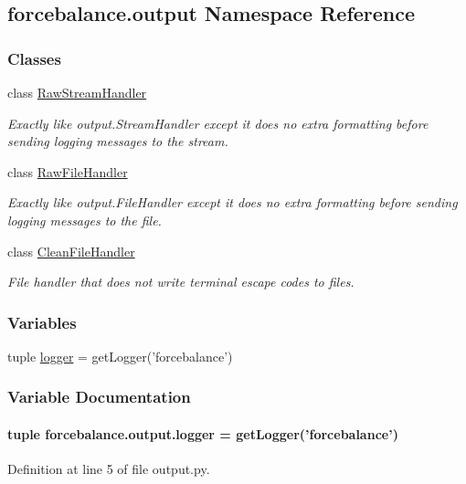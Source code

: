 \hypertarget{namespaceforcebalance_1_1output}{\subsection{forcebalance.\-output Namespace Reference}
\label{namespaceforcebalance_1_1output}
}
\subsubsection*{Classes}
\begin{DoxyCompactItemize}
\item 
class \hyperlink{classforcebalance_1_1output_1_1RawStreamHandler}{Raw\-Stream\-Handler}
\begin{DoxyCompactList}\small\item\em Exactly like output.\-Stream\-Handler except it does no extra formatting before sending logging messages to the stream. \end{DoxyCompactList}\item 
class \hyperlink{classforcebalance_1_1output_1_1RawFileHandler}{Raw\-File\-Handler}
\begin{DoxyCompactList}\small\item\em Exactly like output.\-File\-Handler except it does no extra formatting before sending logging messages to the file. \end{DoxyCompactList}\item 
class \hyperlink{classforcebalance_1_1output_1_1CleanFileHandler}{Clean\-File\-Handler}
\begin{DoxyCompactList}\small\item\em File handler that does not write terminal escape codes to files. \end{DoxyCompactList}\end{DoxyCompactItemize}
\subsubsection*{Variables}
\begin{DoxyCompactItemize}
\item 
tuple \hyperlink{namespaceforcebalance_1_1output_a870a4f031710283f04ba9eb0908fa5fa}{logger} = get\-Logger('forcebalance')
\end{DoxyCompactItemize}


\subsubsection{Variable Documentation}
\hypertarget{namespaceforcebalance_1_1output_a870a4f031710283f04ba9eb0908fa5fa}{
\paragraph[{logger}]{\setlength{\rightskip}{0pt plus 5cm}tuple forcebalance.\-output.\-logger = get\-Logger('forcebalance')}}\label{namespaceforcebalance_1_1output_a870a4f031710283f04ba9eb0908fa5fa}


Definition at line 5 of file output.\-py.

